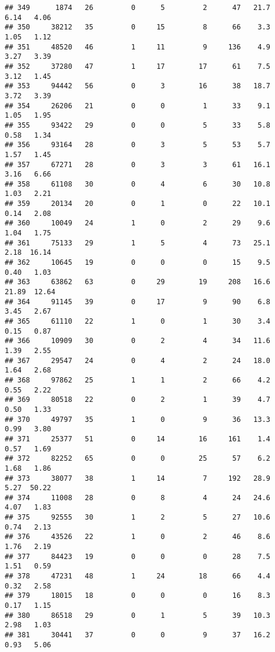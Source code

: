 \documentclass[
]{article}
\begin{document}
\begin{verbatim}
## 349      1874   26         0      5         2      47   21.7    6.14   4.06
## 350     38212   35         0     15         8      66    3.3    1.05   1.12
## 351     48520   46         1     11         9     136    4.9    3.27   3.39
## 352     37280   47         1     17        17      61    7.5    3.12   1.45
## 353     94442   56         0      3        16      38   18.7    3.72   3.39
## 354     26206   21         0      0         1      33    9.1    1.05   1.95
## 355     93422   29         0      0         5      33    5.8    0.58   1.34
## 356     93164   28         0      3         5      53    5.7    1.57   1.45
## 357     67271   28         0      3         3      61   16.1    3.16   6.66
## 358     61108   30         0      4         6      30   10.8    1.03   2.21
## 359     20134   20         0      1         0      22   10.1    0.14   2.08
## 360     10049   24         1      0         2      29    9.6    1.04   1.75
## 361     75133   29         1      5         4      73   25.1    2.18  16.14
## 362     10645   19         0      0         0      15    9.5    0.40   1.03
## 363     63862   63         0     29        19     208   16.6   21.89  12.64
## 364     91145   39         0     17         9      90    6.8    3.45   2.67
## 365     61110   22         1      0         1      30    3.4    0.15   0.87
## 366     10909   30         0      2         4      34   11.6    1.39   2.55
## 367     29547   24         0      4         2      24   18.0    1.64   2.68
## 368     97862   25         1      1         2      66    4.2    0.55   2.22
## 369     80518   22         0      2         1      39    4.7    0.50   1.33
## 370     49797   35         1      0         9      36   13.3    0.99   3.80
## 371     25377   51         0     14        16     161    1.4    0.57   1.69
## 372     82252   65         0      0        25      57    6.2    1.68   1.86
## 373     38077   38         1     14         7     192   28.9    5.27  50.22
## 374     11008   28         0      8         4      24   24.6    4.07   1.83
## 375     92555   30         1      2         5      27   10.6    0.74   2.13
## 376     43526   22         1      0         2      46    8.6    1.76   2.19
## 377     84423   19         0      0         0      28    7.5    1.51   0.59
## 378     47231   48         1     24        18      66    4.4    0.32   2.58
## 379     18015   18         0      0         0      16    8.3    0.17   1.15
## 380     86518   29         0      1         5      39   10.3    2.98   1.03
## 381     30441   37         0      0         9      37   16.2    0.93   5.06

\end{verbatim}
\end{document}
